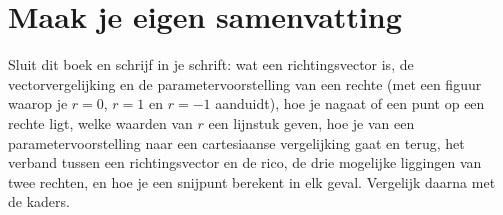\ifzelfstudie
\section*{Maak je eigen samenvatting}
Sluit dit boek en schrijf in je schrift: wat een richtingsvector is, de vectorvergelijking en de parametervoorstelling van een rechte (met een figuur waarop je $r = 0$, $r = 1$ en $r = -1$ aanduidt), hoe je nagaat of een punt op een rechte ligt, welke waarden van $r$ een lijnstuk geven, hoe je van een parametervoorstelling naar een cartesiaanse vergelijking gaat en terug, het verband tussen een richtingsvector en de rico, de drie mogelijke liggingen van twee rechten, en hoe je een snijpunt berekent in elk geval. Vergelijk daarna met de kaders.
\fi
